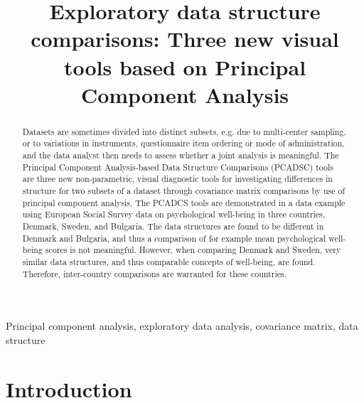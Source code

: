 \documentclass[]{interact}
\theoremstyle{plain}%
\theoremstyle{definition}
\theoremstyle{remark}
\begin{document}

\title{Exploratory data structure comparisons: Three new visual tools based on Principal Component Analysis}


\maketitle

\begin{abstract}
Datasets are sometimes divided into distinct subsets, e.g. due to multi-center sampling, or to variations in instruments, questionnaire item ordering or mode of administration, and the data analyst then needs to assess whether a joint analysis is meaningful. The Principal Component Analysis-based Data Structure Comparisons (PCADSC) tools are three new non-parametric, visual diagnostic tools for investigating differences in structure for two subsets of a dataset through covariance matrix comparisons by use of principal component analysis. The PCADCS tools are demonstrated in a data example using European Social Survey data on psychological well-being in three countries, Denmark, Sweden, and Bulgaria. The data structures are found to be different in Denmark and Bulgaria, and thus a comparison of for example mean psychological well-being scores is not meaningful. However, when comparing Denmark and Sweden, very similar data structures, and thus comparable concepts of well-being, are found. Therefore, inter-country comparisons are warranted for these countries.
\end{abstract}

\begin{keywords}
Principal component analysis, exploratory data analysis, covariance matrix,
data structure 
\end{keywords}
\title{}

\section{Introduction}\label{sec:introduction}
\end{document}
